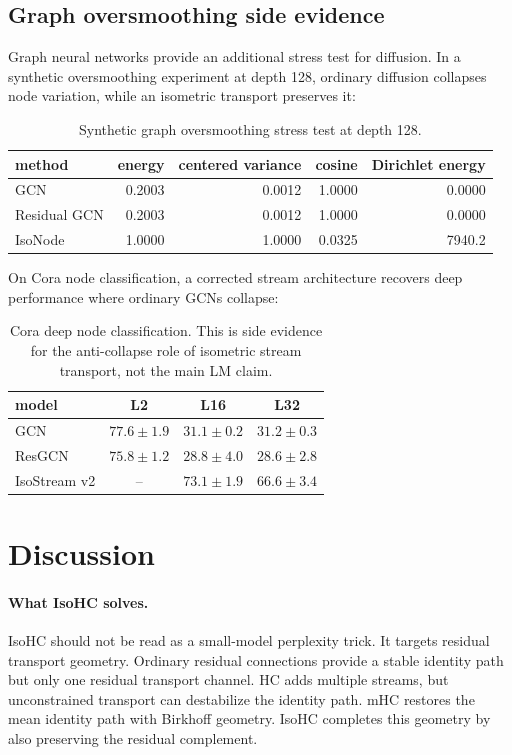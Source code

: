 \documentclass[10pt]{article}
\begin{document}
\subsection{Graph oversmoothing side evidence}

Graph neural networks provide an additional stress test for diffusion.  In a
synthetic oversmoothing experiment at depth 128, ordinary diffusion collapses
node variation, while an isometric transport preserves it:

\begin{table}[t]
\centering
\caption{Synthetic graph oversmoothing stress test at depth 128.}
\label{tab:gnn}
\begin{tabular}{lrrrr}
\toprule
method & energy & centered variance & cosine & Dirichlet energy \\
\midrule
GCN & 0.2003 & 0.0012 & 1.0000 & 0.0000 \\
Residual GCN & 0.2003 & 0.0012 & 1.0000 & 0.0000 \\
IsoNode & 1.0000 & 1.0000 & 0.0325 & 7940.2 \\
\bottomrule
\end{tabular}
\end{table}

On Cora node classification, a corrected stream architecture recovers deep
performance where ordinary GCNs collapse:
\begin{table}[t]
\centering
\caption{Cora deep node classification.  This is side evidence for the
anti-collapse role of isometric stream transport, not the main LM claim.}
\label{tab:cora}
\begin{tabular}{lccc}
\toprule
model & L2 & L16 & L32 \\
\midrule
GCN & $77.6\pm1.9$ & $31.1\pm0.2$ & $31.2\pm0.3$ \\
ResGCN & $75.8\pm1.2$ & $28.8\pm4.0$ & $28.6\pm2.8$ \\
IsoStream v2 & -- & $73.1\pm1.9$ & $66.6\pm3.4$ \\
\bottomrule
\end{tabular}
\end{table}

\section{Discussion}

\paragraph{What IsoHC solves.}
IsoHC should not be read as a small-model perplexity trick.  It targets residual
transport geometry.  Ordinary residual connections provide a stable identity
path but only one residual transport channel.  HC adds multiple streams, but
unconstrained transport can destabilize the identity path.  mHC restores the
mean identity path with Birkhoff geometry.  IsoHC completes this geometry by
also preserving the residual complement.
\end{document}
